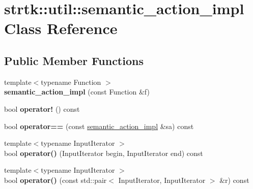 \hypertarget{classstrtk_1_1util_1_1semantic__action__impl}{\section{strtk\-:\-:util\-:\-:semantic\-\_\-action\-\_\-impl Class Reference}
\label{classstrtk_1_1util_1_1semantic__action__impl}
}
\subsection*{Public Member Functions}
\begin{DoxyCompactItemize}
\item 
\hypertarget{classstrtk_1_1util_1_1semantic__action__impl_a25496214df7bb984be4a146e255c8927}{{\footnotesize template$<$typename Function $>$ }\\{\bfseries semantic\-\_\-action\-\_\-impl} (const Function \&f)}\label{classstrtk_1_1util_1_1semantic__action__impl_a25496214df7bb984be4a146e255c8927}

\item 
\hypertarget{classstrtk_1_1util_1_1semantic__action__impl_a9825c06e9f637de97d7a6b9e66569dcc}{bool {\bfseries operator!} () const }\label{classstrtk_1_1util_1_1semantic__action__impl_a9825c06e9f637de97d7a6b9e66569dcc}

\item 
\hypertarget{classstrtk_1_1util_1_1semantic__action__impl_ad14c7f9d8535896423892efe5405fa91}{bool {\bfseries operator==} (const \hyperlink{classstrtk_1_1util_1_1semantic__action__impl}{semantic\-\_\-action\-\_\-impl} \&sa) const }\label{classstrtk_1_1util_1_1semantic__action__impl_ad14c7f9d8535896423892efe5405fa91}

\item 
\hypertarget{classstrtk_1_1util_1_1semantic__action__impl_a102435b699a5f52b9993e134a72786dd}{{\footnotesize template$<$typename Input\-Iterator $>$ }\\bool {\bfseries operator()} (Input\-Iterator begin, Input\-Iterator end) const }\label{classstrtk_1_1util_1_1semantic__action__impl_a102435b699a5f52b9993e134a72786dd}

\item 
\hypertarget{classstrtk_1_1util_1_1semantic__action__impl_ae8269865f757bb6e3c799f6fda3cea6b}{{\footnotesize template$<$typename Input\-Iterator $>$ }\\bool {\bfseries operator()} (const std\-::pair$<$ Input\-Iterator, Input\-Iterator $>$ \&r) const }\label{classstrtk_1_1util_1_1semantic__action__impl_ae8269865f757bb6e3c799f6fda3cea6b}


\end{DoxyCompactItemize}
